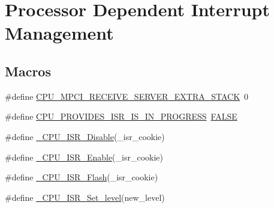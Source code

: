 \hypertarget{group__RTEMSScoreCPUV850CPUInterrupt}{}\section{Processor Dependent Interrupt Management}
\label{group__RTEMSScoreCPUV850CPUInterrupt}
\subsection*{Macros}
\begin{DoxyCompactItemize}
\item 
\#define \mbox{\hyperlink{group__RTEMSScoreCPUV850CPUInterrupt_gab94869be93a41da88a10fa59771ce2c9}{C\+P\+U\+\_\+\+M\+P\+C\+I\+\_\+\+R\+E\+C\+E\+I\+V\+E\+\_\+\+S\+E\+R\+V\+E\+R\+\_\+\+E\+X\+T\+R\+A\+\_\+\+S\+T\+A\+CK}}~0
\item 
\#define \mbox{\hyperlink{group__RTEMSScoreCPUV850CPUInterrupt_ga47f6e4d60c72b5f65fc775b0b5dd14ec}{C\+P\+U\+\_\+\+P\+R\+O\+V\+I\+D\+E\+S\+\_\+\+I\+S\+R\+\_\+\+I\+S\+\_\+\+I\+N\+\_\+\+P\+R\+O\+G\+R\+E\+SS}}~\mbox{\hyperlink{group__RTEMSScoreBaseDefs_gaa93f0eb578d23995850d61f7d61c55c1}{F\+A\+L\+SE}}
\item 
\#define \mbox{\hyperlink{group__RTEMSScoreCPUV850CPUInterrupt_gaca3fde6f372ee51fdd893c260e7d7146}{\+\_\+\+C\+P\+U\+\_\+\+I\+S\+R\+\_\+\+Disable}}(\+\_\+isr\+\_\+cookie)
\item 
\#define \mbox{\hyperlink{group__RTEMSScoreCPUV850CPUInterrupt_gae3b1e2cd1ea4020d229e759569459664}{\+\_\+\+C\+P\+U\+\_\+\+I\+S\+R\+\_\+\+Enable}}(\+\_\+isr\+\_\+cookie)
\item 
\#define \mbox{\hyperlink{group__RTEMSScoreCPUV850CPUInterrupt_gac7e58e16c6b558daf31fe8f9dbec5a69}{\+\_\+\+C\+P\+U\+\_\+\+I\+S\+R\+\_\+\+Flash}}(\+\_\+isr\+\_\+cookie)
\item 
\#define \mbox{\hyperlink{group__RTEMSScoreCPUV850CPUInterrupt_gaed8717a2f15938d954c7124cd11e899f}{\+\_\+\+C\+P\+U\+\_\+\+I\+S\+R\+\_\+\+Set\+\_\+level}}(new\+\_\+level)
\end{DoxyCompactItemize}
